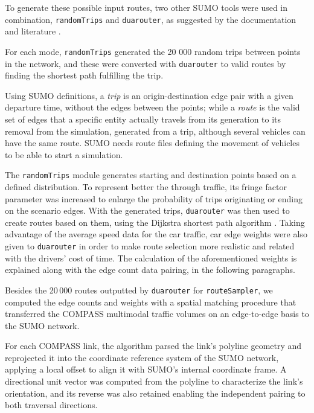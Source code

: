 To generate these possible input routes, two other SUMO tools were used in combination, \texttt{randomTrips} and \texttt{duarouter}, as suggested by the documentation and literature \cite{Ostendorf2025}.

For each mode, \texttt{randomTrips} generated the 20 000 random trips between points in the network, and these were converted with \texttt{duarouter} to valid routes by finding the shortest path fulfilling the trip.

Using SUMO definitions, a \textit{trip} is an origin-destination edge pair with a given departure time, without the edges between the points; while a \textit{route} is the valid set of edges that a specific entity actually travels from its generation to its removal from the simulation, generated from a trip, although several vehicles can have the same route. SUMO needs route files defining the movement of vehicles to be able to start a simulation.

The \texttt{randomTrips} module generates starting and destination points based on a defined distribution. To represent better the through traffic, its fringe factor parameter was increased to enlarge the probability of trips originating or ending on the scenario edges. With the generated trips, \texttt{duarouter} was then used to create routes based on them, using the Dijkstra shortest path algorithm \cite{Dijkstra1959}. Taking advantage of the average speed data for the car traffic, car edge weights were also given to \texttt{duarouter} in order to make route selection more realistic and related with the drivers' cost of time. The calculation of the aforementioned weights is explained along with the edge count data pairing, in the following paragraphs.

Besides the 20\,000 routes outputted by \texttt{duarouter} for \texttt{routeSampler}, we computed the edge counts and weights with a spatial matching procedure that transferred the COMPASS multimodal traffic volumes on an edge-to-edge basis to the SUMO network.

For each COMPASS link, the algorithm parsed the link's polyline geometry and reprojected it into the coordinate reference system of the SUMO network, applying a local offset to align it with SUMO's internal coordinate frame. A directional unit vector was computed from the polyline to characterize the link's orientation, and its reverse was also retained enabling the independent pairing to both traversal directions.

